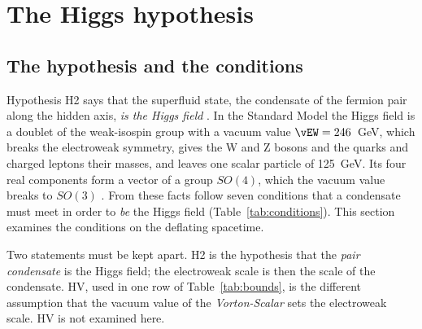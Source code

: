 \section{The Higgs hypothesis}
\label{sec:higgs}

\subsection{The hypothesis and the conditions}

Hypothesis H2 says that the superfluid state, the condensate of the fermion pair along the hidden
axis, \emph{is the Higgs field} \cite{Higgs1964}. In the Standard Model the Higgs field is a doublet
of the weak-isospin group with a vacuum value $\vEW=246$~GeV, which breaks the electroweak symmetry,
gives the W and Z bosons and the quarks and charged leptons their masses, and leaves one scalar
particle of 125~GeV. Its four real components form a vector of a group $SO(4)$, which the vacuum
value breaks to $SO(3)$ \cite{Sikivie1980}. From these facts follow seven conditions that
a condensate must meet in order to \emph{be} the Higgs field (Table~\ref{tab:conditions}).
 This
section examines the conditions on the deflating spacetime.

Two statements must be kept apart. H2 is the hypothesis that the \emph{pair condensate} is the Higgs
field; the electroweak scale is then the scale of the condensate. HV, used in one row of
Table~\ref{tab:bounds}, is the different assumption that the vacuum value of the
\emph{Vorton-Scalar} sets the electroweak scale. HV is not examined here.

